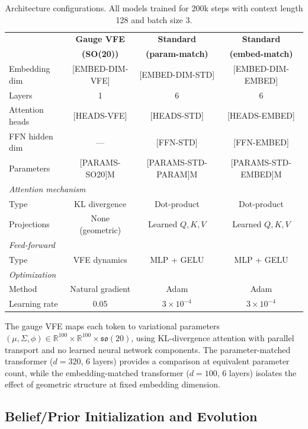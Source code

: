 \documentclass[twoside,11pt]{article}
\begin{document}
\begin{table}[t]
\centering
\small
\caption{Architecture configurations. All models trained for 200k steps with context length 128 and batch size 3.}
\label{tab:arch_details}
\begin{tabular}{lccc}
\toprule
& \textbf{Gauge VFE} & \textbf{Standard} & \textbf{Standard} \\
& \textbf{(SO(20))} & \textbf{(param-match)} & \textbf{(embed-match)} \\
\midrule
Embedding dim & [EMBED-DIM-VFE] & [EMBED-DIM-STD] & [EMBED-DIM-EMBED] \\
Layers & 1 & 6 & 6 \\
Attention heads & [HEADS-VFE] & [HEADS-STD] & [HEADS-EMBED] \\
FFN hidden dim & --- & [FFN-STD] & [FFN-EMBED] \\
Parameters & [PARAMS-SO20]M & [PARAMS-STD-PARAM]M & [PARAMS-STD-EMBED]M \\
\midrule
\multicolumn{4}{l}{\textit{Attention mechanism}} \\
\quad Type & KL divergence & Dot-product & Dot-product \\
\quad Projections & None (geometric) & Learned $Q,K,V$ & Learned $Q,K,V$ \\
\midrule
\multicolumn{4}{l}{\textit{Feed-forward}} \\
\quad Type & VFE dynamics & MLP + GELU & MLP + GELU \\
\midrule
\multicolumn{4}{l}{\textit{Optimization}} \\
\quad Method & Natural gradient & Adam & Adam \\
\quad Learning rate & 0.05 & $3 \times 10^{-4}$ & $3 \times 10^{-4}$ \\
\bottomrule
\end{tabular}
\end{table}

The gauge VFE maps each token to variational parameters $(\mu, \Sigma, \phi) \in \mathbb{R}^{100} \times \mathbb{R}^{100} \times \mathfrak{so}(20)$, using KL-divergence attention with parallel transport and no learned neural network components. The parameter-matched transformer ($d=320$, 6 layers) provides a comparison at equivalent parameter count, while the embedding-matched transformer ($d=100$, 6 layers) isolates the effect of geometric structure at fixed embedding dimension.

\subsection{Belief/Prior Initialization and Evolution}
\end{document}
